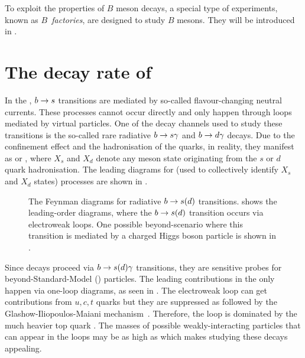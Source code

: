 To exploit the properties of $B$ meson decays, a special type of experiments, known as \textit{$B$~factories}, are designed to study $B$ mesons.
They will be introduced in .

\section{The decay rate of \texorpdfstring{\BtoXsdgamma}{B->Xsg}}\label{sec:btosgamma_totalrate_theory}

In the \SM, $b\rightarrow s$ transitions are mediated by so-called flavour-changing neutral currents.
These processes cannot occur directly and only happen through loops mediated by virtual particles.
One of the decay channels used to study these transitions is the so-called rare radiative $b\rightarrow s\gamma$ and $b\rightarrow d\gamma$ decays.
Due to the confinement effect and the hadronisation of the quarks, in reality, they manifest as \BtoXsgamma or \BtoXdgamma, where $X_s$ and $X_d$ denote any meson state originating from the $s$ or $d$ quark hadronisation.
The leading \SM diagrams for \BtoXsdgamma (used to collectively identify $X_s$ and $X_d$ states) processes are shown in .

\begin{figure}[hbtp!]
\resizebox{0.66\textwidth}{!}{
    \subcaptionbox{\label{fig:sm_diagrams}}{
        
        
    }
}
\resizebox{0.33\textwidth}{!}{
\subcaptionbox{\label{fig:bsm_diagrams}}{
    
}
}
\caption{\label{fig:b_to_s_gamma_diagrams}
The Feynman diagrams for radiative $b\rightarrow s(d)$ transitions. 
 shows the leading-order \SM diagrams, where the $b\rightarrow s(d)$ transition occurs via electroweak loops.
One possible beyond-\SM scenario where this transition is mediated by a charged Higgs boson particle is shown in .
}
\end{figure}

Since \BtoXsdgamma decays proceed via $b\rightarrow s(d)\gamma$ transitions, they are sensitive probes for beyond-Standard-Model (\BSM) particles. 
The leading contributions in the \SM only happen via one-loop diagrams, as seen in .
The electroweak loop can get contributions from $u,c,t$ quarks but they are suppressed as followed by the Glashow-Iliopoulos-Maiani mechanism~\cite{Glashow:1970gm}.
Therefore, the loop is dominated by the much heavier top quark \cite{Mannel:2001vn}. 
The masses of possible \BSM weakly-interacting particles that can appear in the loops may be as high as  \cite{Misiak:2020vlo} which makes studying these decays appealing.

